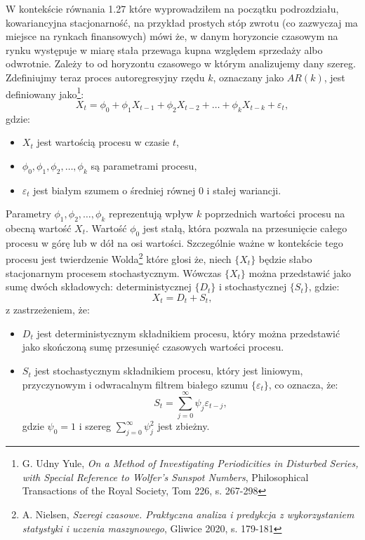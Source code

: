 \begin{enumerate}
W kontekście równania 1.27 które wyprowadziłem na początku podrozdziału, kowariancyjna stacjonarność, na przykład prostych stóp zwrotu (co zazwyczaj ma miejsce na rynkach finansowych) mówi że, w danym horyzoncie czasowym na rynku występuje w miarę stała przewaga kupna względem sprzedaży albo odwrotnie. Zależy to od horyzontu czasowego w którym analizujemy dany szereg. 
  Zdefiniujmy teraz proces autoregresyjny rzędu \( k \), oznaczany jako \( AR(k) \), jest definiowany jako\footnote{G. Udny Yule, \textit{On a Method of Investigating Periodicities in Disturbed Series, with Special Reference to Wolfer's Sunspot Numbers}, Philosophical Transactions of the Royal Society, Tom 226, s. 267-298}:
\begin{equation}
X_t = \phi_0 + \phi_1 X_{t-1} + \phi_2 X_{t-2} + \ldots + \phi_k X_{t-k} + \varepsilon_t,
\end{equation}
gdzie:
\begin{itemize}
  \item \( X_t \) jest wartością procesu w czasie \( t \),
  \item \( \phi_0, \phi_1, \phi_2, \ldots, \phi_k \) są parametrami procesu,
  \item \( \varepsilon_t \) jest białym szumem o średniej równej 0 i stałej wariancji.
\end{itemize}

Parametry \( \phi_1, \phi_2, \ldots, \phi_k \) reprezentują wpływ \( k \) poprzednich wartości procesu na obecną wartość \( X_t \). Wartość \( \phi_0 \) jest stałą, która pozwala na przesunięcie całego procesu w górę lub w dół na osi wartości. Szczególnie ważne w kontekście tego procesu jest twierdzenie Wolda\footnote{A. Nielsen, \textit{Szeregi czasowe. Praktyczna analiza i predykcja z wykorzystaniem statystyki 
i uczenia maszynowego}, Gliwice 2020, s. 179-181} które głosi że, niech \( \{X_t\} \) będzie słabo stacjonarnym procesem stochastycznym. Wówczas \( \{X_t\} \) można przedstawić jako sumę dwóch składowych: deterministycznej \( \{D_t\} \) i stochastycznej \( \{S_t\} \), gdzie:
\begin{equation}
X_t = D_t + S_t,
\end{equation}
z zastrzeżeniem, że:
\begin{itemize}
    \item \( D_t \) jest deterministycznym składnikiem procesu, który można przedstawić jako skończoną sumę przesunięć czasowych wartości procesu.
    \item \( S_t \) jest stochastycznym składnikiem procesu, który jest liniowym, przyczynowym i odwracalnym filtrem białego szumu \( \{\varepsilon_t\} \), co oznacza, że:
    \begin{equation}
    S_t = \sum_{j=0}^{\infty} \psi_j \varepsilon_{t-j},
    \end{equation}
    gdzie \( \psi_0 = 1 \) i szereg \( \sum_{j=0}^{\infty} \psi_j^2 \) jest zbieżny.
\end{itemize}


\end{enumerate}
